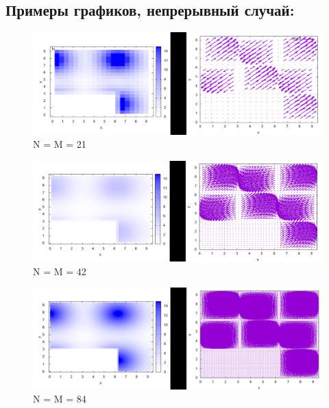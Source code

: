 \documentclass[a4paper,11pt]{article}
\begin{document}
\subsection{Примеры графиков, непрерывный случай:}
\begin{figure}[H]
\centering
\includegraphics[width=1.0\textwidth]{cont_21.png}
\caption{N = M = 21}
\end{figure}
\begin{figure}[H]
\centering
\includegraphics[width=1.0\textwidth]{cont_42.png}
\caption{N = M = 42}
\end{figure}
\begin{figure}[H]
\centering
\includegraphics[width=1.0\textwidth]{cont_84.png}
\caption{N = M = 84}
\end{figure}

\newpage
\end{document}
